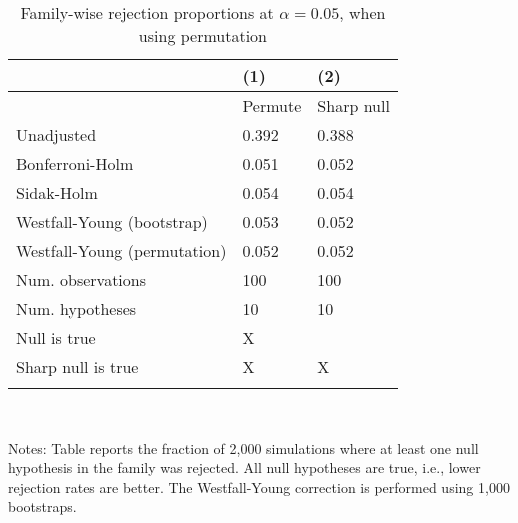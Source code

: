 \documentclass{article}
\begin{document}
\begin{table}[tbp] \centering
{}

\caption{Family-wise rejection proportions at \(\alpha = 0.05\), when using permutation}
\label{tab:wyoung4}
\begin{tabularx}{\linewidth}{@{}lCC@{}}

\toprule
&{(1)}&{(2)} \tabularnewline \midrule
{}&{Permute}&{Sharp null} \tabularnewline
\midrule \addlinespace[\belowrulesep]
Unadjusted&0.392&0.388 \tabularnewline
Bonferroni-Holm&0.051&0.052 \tabularnewline
Sidak-Holm&0.054&0.054 \tabularnewline
Westfall-Young (bootstrap)&0.053&0.052 \tabularnewline
Westfall-Young (permutation)&0.052&0.052 \tabularnewline
\midrule Num. observations&100&100 \tabularnewline
Num. hypotheses&10&10 \tabularnewline
Null is true&X& \tabularnewline
Sharp null is true&X&X \tabularnewline
\bottomrule \addlinespace[\belowrulesep]

\end{tabularx}
\\ \parbox{\linewidth}{\footnotesize Notes: Table reports the fraction of 2,000 simulations where at least one null hypothesis in the family was rejected. All null hypotheses are true, i.e., lower rejection rates are better. The Westfall-Young correction is performed using 1,000 bootstraps.}
\end{table}
\end{document}
